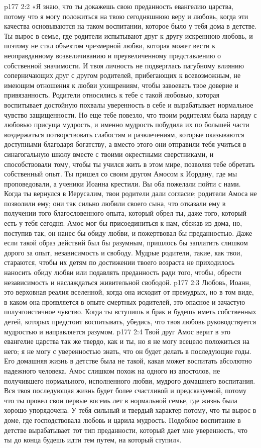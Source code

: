 \vs p177 2:2 «Я знаю, что ты докажешь свою преданность евангелию царства, потому что я могу положиться на твою сегодняшнюю веру и любовь, когда эти качества основываются на таком воспитании, которое было у тебя дома в детстве. Ты вырос в семье, где родители испытывают друг к другу искреннюю любовь, и поэтому не стал объектом чрезмерной любви, которая может вести к неоправданному возвеличиванию и преувеличенному представлению о собственной значимости. И твоя личность не подверглась пагубному влиянию соперничающих друг с другом родителей, прибегающих к всевозможным, не имеющим отношения к любви ухищрениям, чтобы завоевать твое доверие и привязанность. Родители относились к тебе с такой любовью, которая воспитывает достойную похвалы уверенность в себе и вырабатывает нормальное чувство защищенности. Но еще тебе повезло, что твоим родителям была наряду с любовью присуща мудрость, и именно мудрость побудила их по большей части воздержаться потворствовать слабостям и развлечениям, которые оказываются доступными благодаря богатству, а вместо этого они отправили тебя учиться в синагогальную школу вместе с твоими окрестными сверстниками, и способствовали тому, чтобы ты учился жить в этом мире, позволяя тебе обретать собственный опыт. Ты пришел со своим другом Амосом к Иордану, где мы проповедовали, а ученики Иоанна крестили. Вы оба пожелали пойти с нами. Когда ты вернулся в Иерусалим, твои родители дали согласие; родители Амоса не позволили ему; они так сильно любили своего сына, что отказали ему в получении того благословенного опыта, который обрел ты, даже того, который есть у тебя сегодня. Амос мог бы присоединиться к нам, сбежав из дома, но, поступив так, он нанес бы обиду любви, и пожертвовал бы преданностью. Даже если такой образ действий был бы разумным, пришлось бы заплатить слишком дорого за опыт, независимость и свободу. Мудрые родители, такие, как твои, стараются, чтобы их детям по достижении твоего возраста не приходилось наносить обиду любви или подавлять преданность ради того, чтобы, обрести независимость и наслаждаться живительной свободой.
\vs p177 2:3 Любовь, Иоанн, это верховная реалия вселенной, когда она исходит от премудрых, но в том виде, в каком она проявляется в опыте смертных родителей, это опасное и зачастую полуэгоистичное чувство. Когда ты вступишь в брак и будешь иметь собственных детей, которых предстоит воспитывать, убедись, что твоя любовь руководствуется мудростью и направляется разумом.
\vs p177 2:4 Твой друг Амос верит в это евангелие царства так же твердо, как и ты, но я не могу всецело положиться на него; я не могу с уверенностью знать, что он будет делать в последующие годы. Его домашняя жизнь в детстве была не такой, какая может воспитать абсолютно надежного человека. Амос слишком похож на одного из апостолов, не получившего нормального, исполненного любви, мудрого домашнего воспитания. Вся твоя последующая жизнь будет более счастливой и предсказуемой, потому что ты провел свои первые восемь лет в нормальной семье, где жизнь была хорошо упорядочена. У тебя сильный и твердый характер потому, что ты вырос в доме, где господствовала любовь и царила мудрость. Подобное воспитание в детстве вырабатывает тот тип преданности, который дает мне уверенность, что ты до конца будешь идти тем путем, на который ступил».
